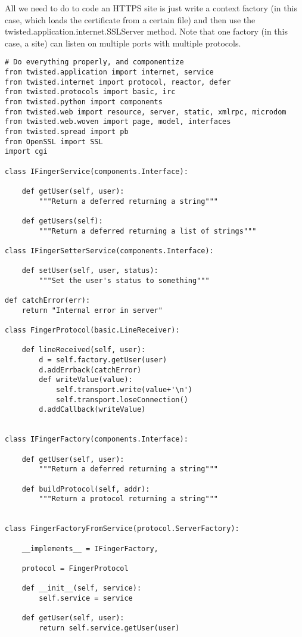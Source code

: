 All we need to do to code an HTTPS site is just write a context factory (in this case, which loads the certificate from a certain file) and then use the twisted.application.internet.SSLServer method. Note that one factory (in this case, a site) can listen on multiple ports with multiple protocols.\begin{verbatim}
# Do everything properly, and componentize
from twisted.application import internet, service
from twisted.internet import protocol, reactor, defer
from twisted.protocols import basic, irc
from twisted.python import components
from twisted.web import resource, server, static, xmlrpc, microdom
from twisted.web.woven import page, model, interfaces
from twisted.spread import pb
from OpenSSL import SSL
import cgi

class IFingerService(components.Interface):

    def getUser(self, user):
        """Return a deferred returning a string"""

    def getUsers(self):
        """Return a deferred returning a list of strings"""

class IFingerSetterService(components.Interface):

    def setUser(self, user, status):
        """Set the user's status to something"""

def catchError(err):
    return "Internal error in server"

class FingerProtocol(basic.LineReceiver):

    def lineReceived(self, user):
        d = self.factory.getUser(user)
        d.addErrback(catchError)
        def writeValue(value):
            self.transport.write(value+'\n')
            self.transport.loseConnection()
        d.addCallback(writeValue)


class IFingerFactory(components.Interface):

    def getUser(self, user):
        """Return a deferred returning a string"""

    def buildProtocol(self, addr):
        """Return a protocol returning a string"""


class FingerFactoryFromService(protocol.ServerFactory):

    __implements__ = IFingerFactory,

    protocol = FingerProtocol

    def __init__(self, service):
        self.service = service

    def getUser(self, user):
        return self.service.getUser(user)


\end{verbatim}
